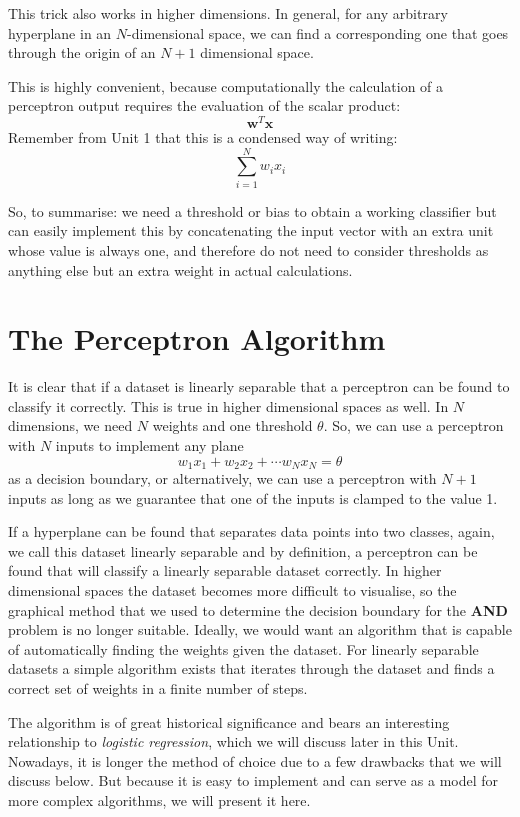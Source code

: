This trick also works in higher dimensions. In general, for any arbitrary hyperplane in an $N$-dimensional space, we can find a corresponding one
that goes through the origin of an $N+1$ dimensional space. 


This is highly convenient, because computationally the calculation of a perceptron output requires the evaluation of the scalar product:
$$
\boldsymbol{w}^T\boldsymbol{x}
$$
Remember from Unit 1 that this is a condensed way of writing:
$$
\sum^N_{i=1} w_i x_i
$$

So, to summarise: we need a threshold or bias to obtain a working classifier but can easily implement this by concatenating the input vector with an extra unit whose
value is always one, and therefore do not need to consider thresholds as anything else but an extra weight in actual calculations.

\section{The Perceptron Algorithm}
It is clear that if a dataset is linearly separable that a perceptron can be found to classify it correctly. This is true in higher dimensional spaces as well.
In $N$ dimensions, we need $N$ weights and one threshold $\theta$. So, we can use a perceptron with $N$ inputs to implement any plane
$$
w_1 x_1 + w_2 x_2 + \cdots w_N x_N = \theta
$$
as a decision boundary, or alternatively, we can use a perceptron with $N+1$ inputs as long as we guarantee that one of the inputs is clamped to the value 1.

If a hyperplane can be found that separates data points into two classes, again, we call this dataset linearly separable and  by definition, a perceptron
can be found that will classify a linearly separable dataset correctly. In higher dimensional spaces the dataset becomes more difficult to visualise, so the graphical
method that we used to determine the decision boundary for the {\bf AND} problem is no longer suitable. Ideally, we would want an algorithm that is capable of
automatically finding the weights given the dataset. For linearly separable datasets a simple algorithm exists that  iterates through the dataset
and finds a correct set of weights in a finite number of steps.

The algorithm is of great historical significance and bears an interesting relationship to \emph{logistic regression}, which we will discuss later in this Unit. Nowadays,
it is longer the method of choice due to a few drawbacks that we will discuss below. But because it is easy to implement and can serve as a model for more complex algorithms,
we will present it here.

